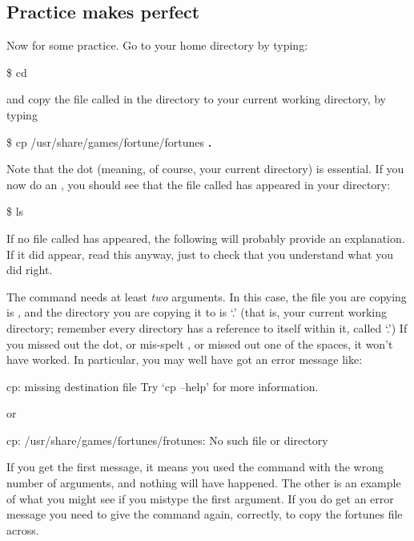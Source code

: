 \subsection{Practice makes perfect}
Now for some practice. Go to your home directory by typing:
%
\begin{ttoutenv}
\$  cd \return
\end{ttoutenv}
%
and copy the file called  in the 
directory to your current working directory, by typing

\begin{ttoutenv}
\$  cp /usr/share/games/fortune/fortunes \textbf{.}  \return
\end{ttoutenv}
%
Note that the dot (meaning, of course, your current directory) is
essential.  If you now do an , you should see that the
file called  has appeared in your directory:

\begin{ttoutenv}
\$  ls \return
\end{ttoutenv}

If no file called  has appeared, the following will
probably provide an explanation. If it did appear, read this anyway, just to
check that you understand what you did right.

The  command needs at least \emph{two} arguments. In this case, the file
you are copying is , and the directory
you are copying it to is `.' (that is, your current working
directory; remember every directory has a reference to itself within
it, called `.') If you missed out the dot, or mis-spelt
, or missed out one of the spaces, it
won't have worked. In particular, you may well have got an error message like:
%
\begin{ttoutenv}
  cp: missing destination file
  Try `cp --help' for more information.
\end{ttoutenv}
%
or
\begin{ttoutenv}
  cp: /usr/share/games/fortunes/frotunes: No such file or directory
\end{ttoutenv}
%
If you get the first message, it means you used the command with the
wrong number of arguments, and nothing will have happened.
The other is an example of what you might see if you mistype the first
argument. If you do get an error message you need to give the command again,
correctly, to copy the fortunes file across.

